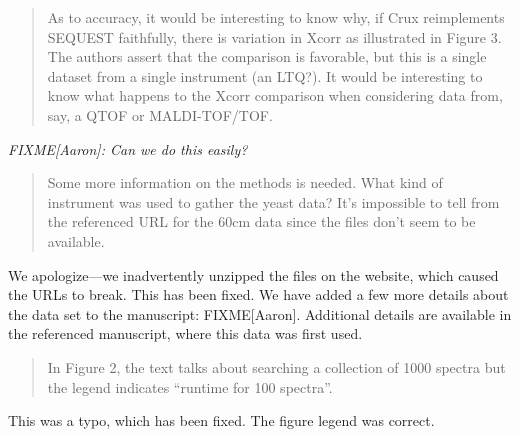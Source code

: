\documentclass{article}
\newcommand{\breview}{\begin{quotation}\begin{em}\noindent}
\newcommand{\ereview}{\end{em}\end{quotation}}
\begin{document}
\breview As to accuracy, it would be interesting to know why, if Crux
reimplements SEQUEST faithfully, there is variation in Xcorr as
illustrated in Figure 3. The authors assert that the comparison is
favorable, but this is a single dataset from a single instrument (an
LTQ?). It would be interesting to know what happens to the Xcorr
comparison when considering data from, say, a QTOF or
MALDI-TOF/TOF. \ereview

{\em FIXME[Aaron]: Can we do this easily?}

\breview Some more information on the methods is needed. What kind of
instrument was used to gather the yeast data? It's impossible to tell
from the referenced URL for the 60cm data since the files don't seem
to be available. \ereview

We apologize---we inadvertently unzipped the files on the website,
which caused the URLs to break.  This has been fixed.  We have added a
few more details about the data set to the manuscript: FIXME[Aaron].
Additional details are available in the referenced manuscript, where
this data was first used.

\breview In Figure 2, the text talks about searching a collection of
1000 spectra but the legend indicates ``runtime for 100
spectra''. \ereview

This was a typo, which has been fixed.  The figure legend was correct.
\end{document}
